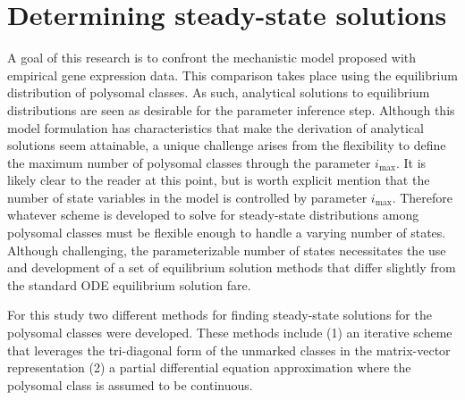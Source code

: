 \documentclass[review]{elsarticle}
\newcommand{\imax}{\ensuremath{i_{\max}}\xspace}
\begin{document}


\section{Determining steady-state solutions}
A goal of this research is to confront the mechanistic model proposed with empirical gene expression data.
This comparison takes place using the equilibrium distribution of polysomal classes.
As such, analytical solutions to equilibrium distributions are seen as desirable for the parameter inference step.
Although this model formulation has characteristics that make the derivation of analytical solutions seem attainable, a unique challenge arises from the flexibility to define the maximum number of polysomal classes through the parameter \imax.
It is likely clear to the reader at this point, but is worth explicit mention that the number of state variables in the model is controlled by parameter \imax.
Therefore whatever scheme is developed to solve for steady-state distributions among polysomal classes must be flexible enough to handle a varying number of states.
Although challenging, the parameterizable number of states necessitates the use and development of a set of equilibrium solution methods that differ slightly from the standard ODE equilibrium solution fare.


For this study two different methods for finding steady-state solutions for the polysomal classes were developed.
These methods include (1) an iterative scheme that leverages the tri-diagonal form of the unmarked classes in the matrix-vector representation (2) a partial differential equation approximation where the polysomal class is assumed to be continuous.  
\end{document}
